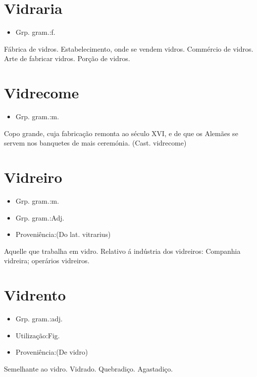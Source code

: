 \documentclass{article}
\begin{document}
\section{Vidraria}
\begin{itemize}
\item {Grp. gram.:f.}
\end{itemize}
Fábrica de vidros.
Estabelecimento, onde se vendem vidros.
Commércio de vidros.
Arte de fabricar vidros.
Porção de vidros.
\section{Vidrecome}
\begin{itemize}
\item {Grp. gram.:m.}
\end{itemize}
Copo grande, cuja fabricação remonta ao século XVI, e de que os Alemães se servem nos banquetes de mais ceremónia.
(Cast. \textunderscore vidrecome\textunderscore )
\section{Vidreiro}
\begin{itemize}
\item {Grp. gram.:m.}
\end{itemize}
\begin{itemize}
\item {Grp. gram.:Adj.}
\end{itemize}
\begin{itemize}
\item {Proveniência:(Do lat. \textunderscore vitrarius\textunderscore )}
\end{itemize}
Aquelle que trabalha em vidro.
Relativo á indústria dos vidreiros: \textunderscore Companhia vidreira\textunderscore ; \textunderscore operários vidreiros\textunderscore .
\section{Vidrento}
\begin{itemize}
\item {Grp. gram.:adj.}
\end{itemize}
\begin{itemize}
\item {Utilização:Fig.}
\end{itemize}
\begin{itemize}
\item {Proveniência:(De \textunderscore vidro\textunderscore )}
\end{itemize}
Semelhante ao vidro.
Vidrado.
Quebradiço.
Agastadiço.
\end{document}
